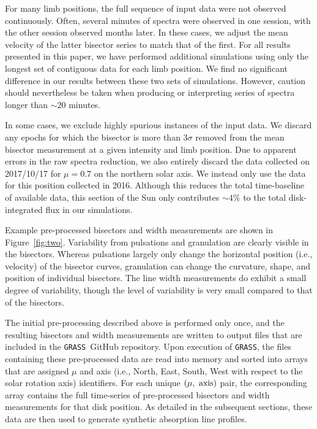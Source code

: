\documentclass[twocolumn]{aastex63}
\newcommand{\grass}{\texttt{GRASS}}
\newcommand{\revise}[1]{#1}
\begin{document}
For many limb positions, the full sequence of input data were not observed continuously. Often, several minutes of spectra were observed in one session, with the other session observed months later. In these cases, we adjust the mean velocity of the latter bisector series to match that of the first. For all results presented in this paper, we have performed additional simulations using only the longest set of contiguous data for each limb position. We find no significant difference in our results between these two sets of simulations. However, caution should nevertheless be taken when producing or interpreting series of spectra longer than $\sim$20 minutes. \par 

In some cases, we exclude highly spurious instances of the input data. We discard any epochs for which the bisector is more than $3\sigma$ removed from the mean bisector measurement at a given intensity and limb position. Due to apparent errors in the raw spectra reduction, we also entirely discard the data collected on 2017/10/17 for $\mu = 0.7$ on the northern solar axis. We instead only use the data for this position collected in 2016. Although this reduces the total time-baseline of available data, this section of the Sun only contributes $\sim$$4\%$ to the total disk-integrated flux in our simulations. \par 

Example pre-processed bisectors and width measurements are shown in Figure~\ref{fig:two}. Variability from pulsations and granulation are clearly visible in the bisectors. Whereas pulsations largely only change the horizontal position (i.e., velocity) of the bisector curves, granulation can change the curvature, shape, and position of individual bisectors. The line width measurements do exhibit a small degree of variability, though the level of variability is very small compared to that of the bisectors. \par 

The initial pre-processing described above is performed only once, and the resulting bisectors and width measurements are written to output files that are included in the \grass\ GitHub repository. Upon execution of \grass, the files containing these pre-processed data are read into memory and sorted into arrays that are assigned $\mu$ and axis \revise{(i.e., North, East, South, West with respect to the solar rotation axis)} identifiers. For each unique \revise{$(\mu{\rm,\ axis})$} pair, the corresponding array contains the full time-series of pre-processed bisectors and width measurements for that disk position. As detailed in the subsequent sections, these data are then used to generate synthetic absorption line profiles. \par
\end{document}
